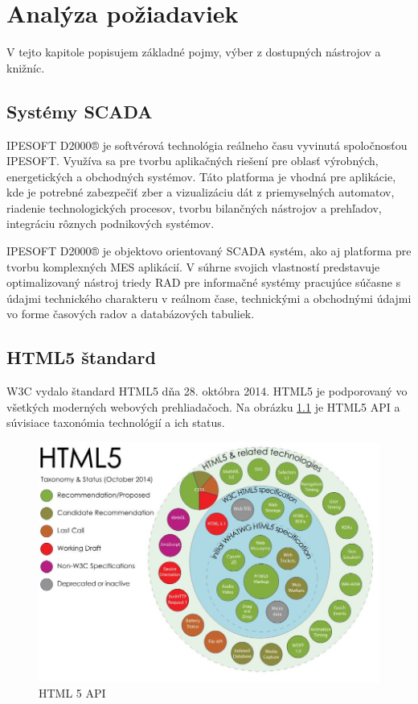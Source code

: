 







\chapter{Analýza požiadaviek} 

V tejto kapitole popisujem základné pojmy, výber z dostupných nástrojov a knižníc. 

\section{Systémy \acs{SCADA} }
IPESOFT D2000® je softvérová technológia reálneho času vyvinutá spoločnosťou IPESOFT. Využíva sa pre tvorbu aplikačných riešení pre oblasť výrobných, energetických a obchodných systémov. Táto platforma je vhodná pre aplikácie, kde je potrebné zabezpečiť zber a vizualizáciu dát z priemyselných automatov, riadenie technologických procesov, tvorbu bilančných nástrojov a prehľadov, integráciu rôznych podnikových systémov.\cite{ipesoft}

IPESOFT D2000® je objektovo orientovaný \ac{SCADA} systém, ako aj platforma pre tvorbu komplexných \ac{MES} aplikácií. V súhrne svojich vlastností predstavuje optimalizovaný nástroj triedy \ac{RAD} pre informačné systémy pracujúce súčasne s údajmi technického charakteru v reálnom čase, technickými a obchodnými údajmi vo forme časových radov a  databázových tabuliek. \cite{ipesoft}

\section{\acs{HTML}5 štandard}

\ac{W3C} vydalo štandard \acs{HTML}5 dňa 28. októbra 2014. 
HTML5 je podporovaný vo všetkých moderných webových prehliadačoch. 
Na obrázku \ref{fig:obrazokHTML} \cite{sergey} je HTML5 \acs{API} a súvisiace taxonómia technológií a ich status. 

\begin{center}
	\begin{figure}[H]
\centering
\includegraphics[width=0.7\linewidth]{obrazky/obrazokHTML}
\caption{HTML 5 API}
\label{fig:obrazokHTML}
\end{figure}
\end{center}

